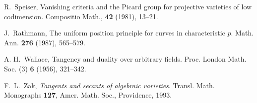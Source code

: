 \documentclass[a4paper,12pt]{amsart}
\theoremstyle{plain}
\theoremstyle{definition}
\begin{document}
\begin{thebibliography}{99}
 R.~Speiser, Vanishing criteria and the Picard group for projective varieties of low codimension. Compositio Math., \textbf{42} (1981), 13--21.

 J.~Rathmann, The uniform position principle for curves in characteristic $p$. Math. Ann. {\bf 276} (1987), 565--579.

  
 A. H.~Wallace, Tangency and duality over arbitrary fields. Proc. London Math. Soc. (3) {\bf 6} (1956), 321--342.

  

  F.~L.~Zak, \emph{Tangents and secants of algebraic varieties}.
  Transl. Math. Monographs {\bf 127},  Amer. Math. Soc., Providence, 1993. 

\end{thebibliography}
\end{document}
